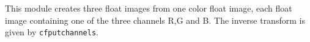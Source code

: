 This module creates three float images from one color float image,
each float image containing one of the three channels R,G and B.
The inverse transform is given by \verb+cfputchannels+.

